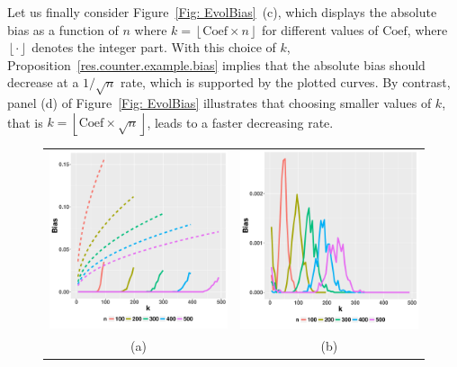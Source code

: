 \documentclass[twoside,11pt]{article}
\numberwithin{equation}{section}
\newcommand{\floor}[1]{\left\lfloor #1 \right\rfloor}
\newcommand{\1}{\mathds{1}}%
\numberwithin{equation}{section}
\theoremstyle{plain}
\begin{document}
Let us finally consider Figure~\ref{Fig: EvolBias}~(c), which displays the absolute bias as a function of $n$ where $k = \floor{\mbox{Coef} \times n}$ for different values of $\mbox{Coef}$, where $\floor{\cdot}$ denotes the integer part.
%
With this choice of $k$, Proposition~\ref{res.counter.example.bias} implies that the absolute bias should decrease at a $1/\sqrt{n}$ rate, which is supported by the plotted curves. By contrast,  panel (d) of Figure~\ref{Fig: EvolBias} illustrates that choosing smaller values of $k$, that is $k = \floor{\mbox{Coef} \times \sqrt{n}}$, leads to a faster decreasing rate.


\begin{figure}
	\hspace*{-1cm}
\begin{tabular}{cc}
\includegraphics[width=8cm]{./Bias_vs_k_Pi05_EtaA0_EtaB1_ggplot} &
\includegraphics[width=8cm]{./Bias_vs_k_Pi02_EtaA02_EtaB09_ggplot_WithoutUB} \\
(a) & (b)\\

\end{tabular}
\end{figure}
\end{document}
